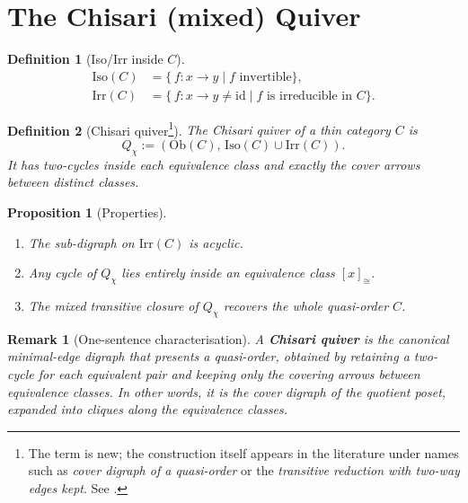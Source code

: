 \documentclass{article}
\newtheorem{definition}{Definition}
\newtheorem{proposition}{Proposition}
\newtheorem{remark}{Remark}
\begin{document}
\section{The \textbf{Chisari} (mixed) Quiver}

\begin{definition}[Iso/\!Irr inside $C$]
\begin{align*}
\mathrm{Iso}(C) &= \{\,f:x\to y \mid f\text{ invertible}\},\\[2pt]
\mathrm{Irr}(C) &= \{\,f:x\to y\neq\mathrm{id}\mid f\text{ is irreducible in }C\}.
\end{align*}
\end{definition}

\begin{definition}[Chisari quiver\footnote{The term is new; the construction itself appears in the literature under names such as \emph{cover digraph of a quasi-order} or the \emph{transitive reduction with two-way edges kept}.  See \cite{Harry1995,Altomare2020}.}]\label{def:chisari}
The \emph{Chisari quiver} of a thin category $C$ is
\[
  Q_{\chi} := (\mathrm{Ob}(C),\,\mathrm{Iso}(C)\cup\mathrm{Irr}(C)).
\]
It has two-cycles inside each equivalence class and exactly the cover arrows between distinct classes.
\end{definition}

\begin{proposition}[Properties]
\leavevmode
\begin{enumerate}
  \item The sub-digraph on $\mathrm{Irr}(C)$ is acyclic.
  \item Any cycle of $Q_{\chi}$ lies entirely inside an equivalence class $[x]_{\cong}$.
  \item The mixed transitive closure of $Q_{\chi}$ recovers the whole quasi-order $C$.
\end{enumerate}
\end{proposition}

\begin{remark}[One-sentence characterisation]
A \textbf{Chisari quiver} is \emph{the canonical minimal-edge digraph that presents a quasi-order, obtained by retaining a two-cycle for each equivalent pair and keeping only the covering arrows between equivalence classes}.  In other words, it is the cover digraph of the quotient poset, expanded into cliques along the equivalence classes.
\end{remark}
\end{document}
